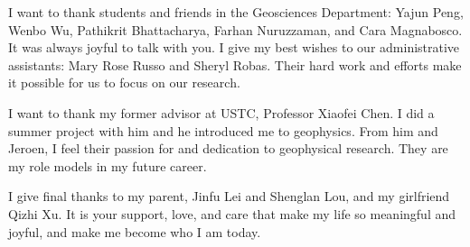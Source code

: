I want to thank students and friends in the Geosciences Department: Yajun Peng, Wenbo Wu, 
Pathikrit Bhattacharya, Farhan Nuruzzaman, and Cara Magnabosco. It was always joyful to talk
with you. I give my best wishes to our administrative assistants: Mary
Rose Russo and Sheryl Robas. Their hard work and efforts make it possible for us
to focus on our research.

I want to thank my former advisor at USTC, Professor Xiaofei Chen. I did a summer project with him
and he introduced me to geophysics. From him and Jeroen, I feel their passion
for and dedication to geophysical research. They are my role models in my future career.

I give final thanks to my parent, Jinfu Lei and Shenglan Lou, and my girlfriend Qizhi Xu.
It is your support, love, and care that make my life so meaningful and joyful, and make
me become who I am today.

